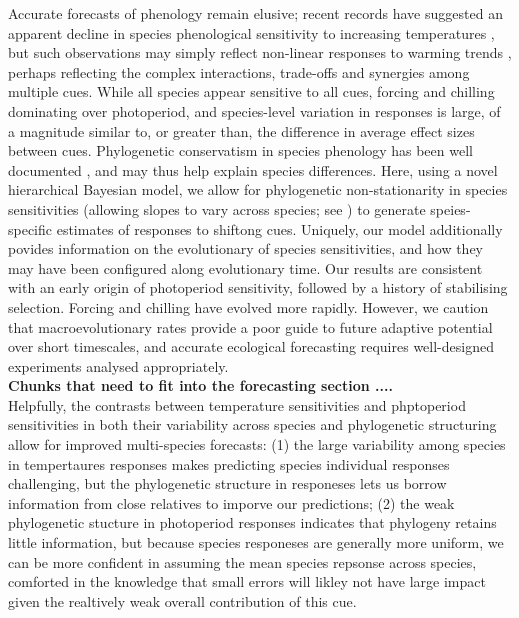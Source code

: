\documentclass{article}\usepackage[]{graphicx}\usepackage[]{color}
\begin{document}
Accurate forecasts of phenology remain elusive; recent records have suggested an apparent decline in species phenological sensitivity to increasing temperatures \citep{fu2015,piao2017}, but such observations may simply reflect non-linear responses to warming trends \citep{wolkovich2021simple}, perhaps reflecting the complex interactions, trade-offs and synergies among multiple cues. While all species appear sensitive to all cues, forcing and chilling dominating over photoperiod, and species-level variation in responses is large, of a magnitude similar to, or greater than, the difference in average effect sizes between cues. Phylogenetic conservatism in species phenology has been well documented \citep{davies2013phylogenetic,rafferty2017global,joly2019importance}, and may thus help explain species differences. Here, using a novel hierarchical Bayesian model, we allow for phylogenetic non-stationarity in species sensitivities (allowing slopes to vary across species; see \citep{davies2019phylogenetically}) to generate speies-specific estimates of responses to shiftong cues. Uniquely, our model additionally povides information on the evolutionary of species sensitivities, and how they may have been configured along evolutionary time. Our results are consistent with an early origin of photoperiod sensitivity, followed by a history of stabilising selection. Forcing and chilling have evolved more rapidly. However, we caution that macroevolutionary rates provide a poor guide to future adaptive potential over short timescales, and accurate ecological forecasting requires well-designed experiments analysed appropriately.\\

{\bf Chunks that need to fit into the forecasting section ....}\\

Helpfully, the contrasts between temperature sensitivities and phptoperiod sensitivities in both their variability across species and phylogenetic structuring allow for improved multi-species forecasts: (1) the large variability among species in tempertaures responses makes predicting species individual responses challenging, but the phylogenetic structure in responeses lets us borrow  information from close relatives to imporve our predictions; (2) the weak phylogenetic stucture in photoperiod responses indicates that phylogeny retains little information, but because species responeses are generally more uniform, we can be more confident in assuming the mean species repsonse across species, comforted in the knowledge that small errors will likley not have large impact given the realtively weak overall contribution of this cue.
\end{document}
